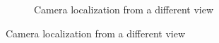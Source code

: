\begin{figure}[H]
\begin{subfigure}[b]{0.49\textwidth}
         \caption{Camera localization from a different view}
     \end{subfigure}
\end{figure}
